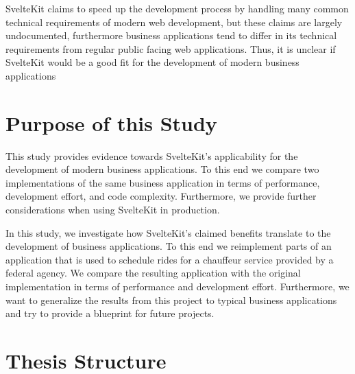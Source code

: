 SvelteKit claims to speed up the development process by handling many common technical requirements of modern web development, but these claims are largely undocumented, furthermore business applications tend to differ in its technical requirements from regular public facing web applications. Thus, it is unclear if SvelteKit would be a good fit for the development of modern business applications

\section{Purpose of this Study}
\label{sec:purpose-of-this-study}
This study provides evidence towards SvelteKit's applicability for the development of modern business applications. To this end we compare two implementations of the same business application in terms of performance, development effort, and code complexity. Furthermore, we provide further considerations when using SvelteKit in production.

In this study, we investigate how SvelteKit's claimed benefits translate to the development of business applications. To this end we reimplement parts of an application that is used to schedule rides for a chauffeur service provided by a federal agency. We compare the resulting application with the original implementation in terms of performance and development effort. Furthermore, we want to generalize the results from this project to typical business applications and try to provide a blueprint for future projects.



\section{Thesis Structure}


